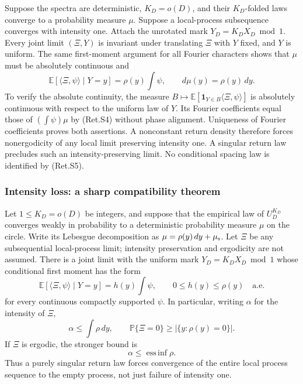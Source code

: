Suppose the spectra are deterministic, \(K_D=o(D)\), and their \(K_D\)-folded
laws converge to a probability measure \(\mu\). Suppose a local-process
subsequence converges with intensity one. Attach the unrotated mark
\(Y_D=K_DX_D\bmod1\). Every joint limit \((\Xi,Y)\) is invariant under translating
\(\Xi\) with \(Y\) fixed, and \(Y\) is uniform. The same first-moment argument for
all Fourier characters shows that \(\mu\) must be absolutely continuous and
\[
 \mathbb E[\langle\Xi,\psi\rangle\mid Y=y]
             =\rho(y)\int\psi,\qquad d\mu(y)=\rho(y)\,dy.        \tag{Ret.S5}
\]
To verify the absolute continuity, the measure
\(B\mapsto\mathbb E[\mathbf1_{Y\in B}\langle\Xi,\psi\rangle]\)
is absolutely continuous with respect to the uniform law of \(Y\). Its Fourier
coefficients equal those of \((\int\psi)\mu\) by (Ret.S4) without phase alignment.
Uniqueness of Fourier coefficients proves both assertions.
A nonconstant return density therefore forces nonergodicity of any local
limit preserving intensity one. A singular return law precludes such an
intensity-preserving limit. No conditional spacing law is identified by (Ret.S5).

\hypertarget{intensity-loss-a-sharp-compatibility-theorem}{%
\subsubsection{Intensity loss: a sharp compatibility theorem}\label{intensity-loss-a-sharp-compatibility-theorem}}

\begin{theorem}\label{pass1:return_obstruction-2} Let \(1\le K_D=o(D)\) be integers, and suppose that the empirical
law of \(U_D^{K_D}\) converges weakly in probability to a deterministic
probability measure \(\mu\) on the circle. Write its Lebesgue decomposition as
\(\mu=\rho(y)\,dy+\mu_{\rm s}\). Let \(\Xi\) be any subsequential local-process
limit; intensity preservation and ergodicity are not assumed.
There is a joint limit with the uniform mark \(Y_D=K_DX_D\bmod1\) whose
conditional first moment has the form
\[
 \mathbb E[\langle\Xi,\psi\rangle\mid Y=y]
      =h(y)\int\psi,\qquad 0\le h(y)\le\rho(y)\quad\text{a.e.}   \tag{Ret.S19}
\]
for every continuous compactly supported \(\psi\). In particular, writing
\(\alpha\) for the intensity of \(\Xi\),
\[
 \alpha\le\int\rho\,dy,\qquad
 \mathbb P\{\Xi=0\}\ge |\{y:\rho(y)=0\}|.                        \tag{Ret.S20}
\]
If \(\Xi\) is ergodic, the stronger bound is
\[
                 \alpha\le\operatorname*{ess\,inf}\rho.          \tag{Ret.S21}
\]
Thus a purely singular return law forces convergence of the entire local
process sequence to the empty process, not just failure of intensity one.
\end{theorem}

